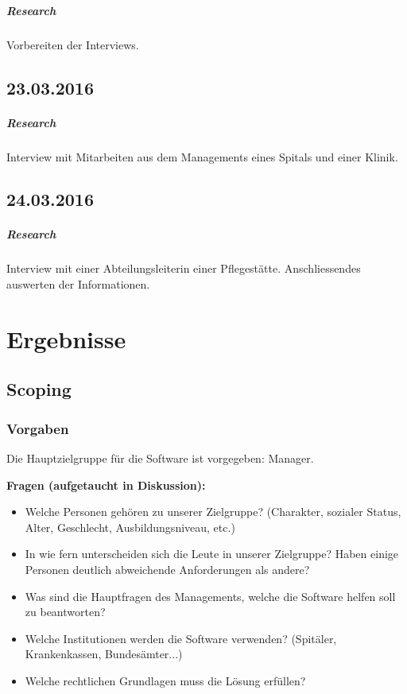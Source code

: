 \documentclass[a4paper]{scrreprt}
\begin{document}
\paragraph{Research}
Vorbereiten der Interviews.


\section*{23.03.2016}
\paragraph{Research}
Interview mit Mitarbeiten aus dem Managements eines Spitals und einer Klinik.


\section*{24.03.2016}
\paragraph{Research}
Interview mit einer Abteilungsleiterin einer Pflegestätte. Anschliessendes auswerten der Informationen.




\chapter{Ergebnisse}
\section{Scoping}

\subsection{Vorgaben}
Die Hauptzielgruppe für die Software ist vorgegeben: Manager.

\bigskip


\textbf{Fragen (aufgetaucht in Diskussion):}
\begin{itemize}
\item Welche Personen gehören zu unserer Zielgruppe? (Charakter, sozialer Status, Alter, Geschlecht, Ausbildungsniveau, etc.)
\item In wie fern unterscheiden sich die Leute in unserer Zielgruppe? Haben einige Personen deutlich abweichende Anforderungen als andere?
\item Was sind die Hauptfragen des Managements, welche die Software helfen soll zu beantworten?
\item Welche Institutionen werden die Software verwenden? (Spitäler, Krankenkassen, Bundesämter...)
\item Welche rechtlichen Grundlagen muss die Lösung erfüllen?
\end{itemize}
\end{document}
